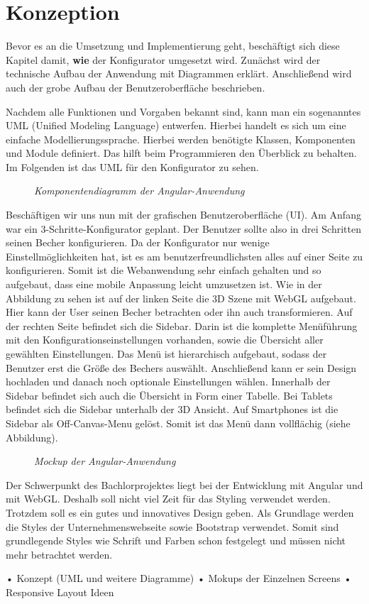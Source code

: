 \section{Konzeption}
\label{sec:konzept}
%
Bevor es an die Umsetzung und Implementierung geht, beschäftigt sich diese Kapitel damit, \textbf{wie} der Konfigurator umgesetzt wird. Zunächst wird der technische Aufbau der Anwendung mit Diagrammen erklärt. Anschließend wird auch der grobe Aufbau der Benutzeroberfläche beschrieben.


 Nachdem alle Funktionen und Vorgaben bekannt sind, kann man ein sogenanntes UML (Unified Modeling Language) entwerfen. Hierbei handelt es sich um eine einfache Modellierungssprache. Hierbei werden benötigte Klassen, Komponenten und Module definiert. Das hilft beim Programmieren den Überblick zu behalten. Im Folgenden  ist das UML für den Konfigurator zu sehen.
\begin{figure}[h]
	\centering
	{}
	\caption[Komponentendiagramm]{\textit{Komponentendiagramm der Angular-Anwendung}}
	\label{fig:ngKomponent}
\end{figure} 
Beschäftigen wir uns nun mit der grafischen Benutzeroberfläche (UI). Am Anfang war ein 3-Schritte-Konfigurator geplant. Der Benutzer sollte also in drei Schritten seinen Becher konfigurieren. Da der Konfigurator nur wenige Einstellmöglichkeiten hat, ist es am benutzerfreundlichsten alles auf einer Seite zu konfigurieren. Somit ist die Webanwendung sehr einfach gehalten und so aufgebaut, dass eine mobile Anpassung leicht umzusetzen ist. Wie in der Abbildung zu sehen ist auf der linken Seite die 3D Szene mit WebGL aufgebaut. Hier kann der User seinen Becher betrachten oder ihn auch transformieren. Auf der rechten Seite befindet sich die Sidebar. Darin ist die komplette Menüführung mit den Konfigurationseinstellungen vorhanden, sowie die Übersicht aller gewählten Einstellungen. Das Menü ist hierarchisch aufgebaut, sodass der Benutzer erst die Größe des Bechers auswählt. Anschließend kann er sein Design hochladen und danach noch optionale Einstellungen wählen. Innerhalb der Sidebar befindet sich auch die Übersicht in Form einer Tabelle. Bei Tablets befindet sich die Sidebar unterhalb der 3D Ansicht. Auf Smartphones ist die Sidebar als Off-Canvas-Menu gelöst. Somit ist das Menü dann vollflächig (siehe Abbildung).
\begin{figure}[h]
	\centering
	{}
	\caption[Mockup]{\textit{Mockup der Angular-Anwendung}}
	\label{fig:mockup}
\end{figure}


Der Schwerpunkt des Bachlorprojektes liegt bei der Entwicklung mit Angular und mit WebGL. Deshalb soll nicht viel Zeit für das Styling verwendet werden. Trotzdem soll es ein gutes und innovatives Design geben. Als Grundlage werden die Styles der Unternehmenswebseite sowie Bootstrap verwendet. Somit sind grundlegende Styles wie Schrift und Farben schon festgelegt und müssen nicht mehr betrachtet werden.



• Konzept (UML und weitere Diagramme)
• Mokups der Einzelnen Screens
• Responsive Layout Ideen \\
%